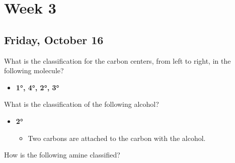 \documentclass[12pt,a4paper]{article}
\begin{document}
\clearpage
\section*{Week 3}
{}

\subsection{Friday, October 16}
\begin{enumerate}
    {\color{G-Moon}\item What is the classification for the carbon centers, from left to right, in the following molecule?


    \hspace{15pt}
    }
    \begin{itemize}
        \item {\color{o-Sun}\textbf{\ang{1}, \ang{4}, \ang{2}, \ang{3}}}
    \end{itemize}
    {\color{G-Moon}\item What is the classification of the following alcohol?
    
    \hspace{15pt}
    }
    \begin{itemize}
        \item {\color{o-Sun}\textbf{\ang{2}}}
            \begin{itemize}
                \item Two carbons are attached to the carbon with the alcohol.
            \end{itemize}
    \end{itemize}
    {\color{G-Moon}\item How is the following amine classified?


}
\end{enumerate}
\end{document}
